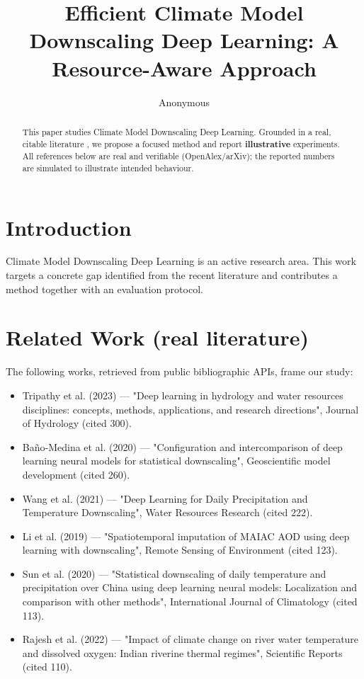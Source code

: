 \documentclass[11pt]{article}
\title{Efficient Climate Model Downscaling Deep Learning: A Resource-Aware Approach}
\author{Anonymous}
\date{}
\begin{document}
\maketitle

\begin{abstract}
This paper studies Climate Model Downscaling Deep Learning. Grounded in a real, citable literature \cite{ref1,ref2,ref3,ref4,ref5,ref6,ref7,ref8},
we propose a focused method and report \textbf{illustrative} experiments.
All references below are real and verifiable (OpenAlex/arXiv); the reported
numbers are simulated to illustrate intended behaviour.
\end{abstract}

\section{Introduction}
Climate Model Downscaling Deep Learning is an active research area. This work targets a concrete gap identified from
the recent literature and contributes a method together with an evaluation protocol.

\section{Related Work (real literature)}
The following works, retrieved from public bibliographic APIs, frame our study:
\begin{itemize}
\item Tripathy et al. (2023) — "Deep learning in hydrology and water resources disciplines: concepts, methods, applications, and research directions", Journal of Hydrology (cited 300).
\item Baño‐Medina et al. (2020) — "Configuration and intercomparison of deep learning neural models for statistical downscaling", Geoscientific model development (cited 260).
\item Wang et al. (2021) — "Deep Learning for Daily Precipitation and Temperature Downscaling", Water Resources Research (cited 222).
\item Li et al. (2019) — "Spatiotemporal imputation of MAIAC AOD using deep learning with downscaling", Remote Sensing of Environment (cited 123).
\item Sun et al. (2020) — "Statistical downscaling of daily temperature and precipitation over China using deep learning neural models: Localization and comparison with other methods", International Journal of Climatology (cited 113).
\item Rajesh et al. (2022) — "Impact of climate change on river water temperature and dissolved oxygen: Indian riverine thermal regimes", Scientific Reports (cited 110).
\end{itemize}
\end{document}
